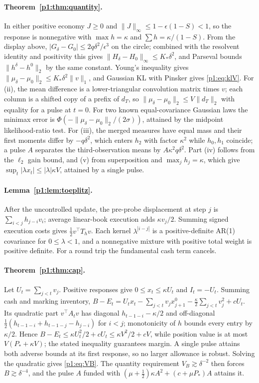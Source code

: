 \paragraph{Theorem~\ref{p1:thm:quantity}.} In either positive economy $J\ge0$ and $\|J\|_\infty\le1-\epsilon(1-S)<1$, so the response is nonnegative with $\max h=\kappa$ and $\sum h=\kappa/(1-S)$. From the display above, $|G_\delta-G_0|\le2q\delta^2/\epsilon^3$ on the circle; combined with the resolvent identity and positivity this gives $\|H_\delta-H_0\|_\infty\le K_*\delta^2$, and Parseval bounds $\|h^\delta-h^0\|_2$ by the same constant. Young's inequality gives $\|\mu_\delta-\mu_0\|_2\le K_*\delta^2\|v\|_1$, and Gaussian KL with Pinsker gives \eqref{p1:eq:klV}. For (ii), the mean difference is a lower-triangular convolution matrix times $v$; each column is a shifted copy of a prefix of $d_T$, so $\|\mu_\delta-\mu_0\|_2\le V\|d_T\|_2$ with equality for a pulse at $t=0$. For two known equal-covariance Gaussian laws the minimax error is $\Phi(-\|\mu_\delta-\mu_0\|_2/(2\sigma))$, attained by the midpoint likelihood-ratio test. For (iii), the merged measures have equal mass and their first moments differ by $-q\delta^2$, which enters $h_2$ with factor $\kappa^2$ while $h_0,h_1$ coincide; a pulse $A$ separates the third-observation means by $A\kappa^2q\delta^2$. Part (iv) follows from the $\ell_2$ gain bound, and (v) from superposition and $\max_jh_j=\kappa$, which give $\sup_t|\lambda x_t|\le|\lambda|\kappa V$, attained by a single pulse.

\paragraph{Lemma~\ref{p1:lem:toeplitz}.} After the uncontrolled update, the pre-probe displacement at step $j$ is $\sum_{i<j}h_{j-i}v_i$; average linear-book execution adds $\kappa v_j/2$. Summing signed execution costs gives $\tfrac12v^\top T_hv$. Each kernel $\lambda^{|i-j|}$ is a positive-definite AR(1) covariance for $0\le\lambda<1$, and a nonnegative mixture with positive total weight is positive definite. For a round trip the fundamental cash term cancels.

\paragraph{Theorem~\ref{p1:thm:cap}.} Let $U_t=\sum_{j<t}v_j$. Positive responses give $0\le x_t\le\kappa U_t$ and $I_t=-U_t$. Summing cash and marking inventory, $B-E_t=U_tx_t-\sum_{j<t}v_jx^0_{j+1}-\tfrac\kappa2\sum_{j<t}v_j^2+cU_t$. Its quadratic part $v^\top A_tv$ has diagonal $h_{t-1-i}-\kappa/2$ and off-diagonal $\tfrac12(h_{t-1-i}+h_{t-1-j}-h_{j-i})$ for $i<j$; monotonicity of $h$ bounds every entry by $\kappa/2$. Hence $B-E_t\le\kappa U_t^2/2+cU_t\le\kappa V^2/2+cV$, while position value is at most $V(P_*+\kappa V)$; the stated inequality guarantees margin. A single pulse attains both adverse bounds at its first response, so no larger allowance is robust. Solving the quadratic gives \eqref{p1:eq:VB}. The quantity requirement $V_B\gtrsim\delta^{-2}$ then forces $B\gtrsim\delta^{-4}$, and the pulse $A$ funded with $(\mu+\tfrac12)\kappa A^2+(c+\mu P_*)A$ attains it.

